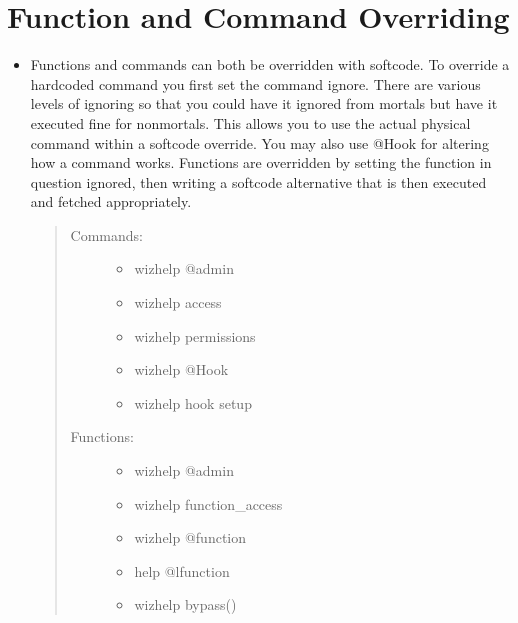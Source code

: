 \documentclass[letterpaper,10pt,english]{sphinxmanual}
\begin{document}
\section{Function and Command Overriding}
\label{\detokenize{12-advanced:function-and-command-overriding}}\begin{itemize}
\item {} 
\sphinxAtStartPar
Functions and commands can both be overridden with softcode.  To
override a hardcoded command you first set the command ignore.
There are various levels of ignoring so that you could have it
ignored from mortals but have it executed fine for non\sphinxhyphen{}mortals.
This allows you to use the actual physical command within a
softcode override.  You may also use @Hook for altering how
a command works.   Functions are overridden by setting the
function in question ignored, then writing a softcode alternative
that is then executed and fetched appropriately.
\begin{quote}
\begin{description}
\item[{Commands:}] \leavevmode\begin{itemize}
\item {} 
\sphinxAtStartPar
wizhelp @admin

\item {} 
\sphinxAtStartPar
wizhelp access

\item {} 
\sphinxAtStartPar
wizhelp permissions

\item {} 
\sphinxAtStartPar
wizhelp @Hook

\item {} 
\sphinxAtStartPar
wizhelp hook setup

\end{itemize}

\item[{Functions:}] \leavevmode\begin{itemize}
\item {} 
\sphinxAtStartPar
wizhelp @admin

\item {} 
\sphinxAtStartPar
wizhelp function\_access

\item {} 
\sphinxAtStartPar
wizhelp @function

\item {} 
\sphinxAtStartPar
help @lfunction

\item {} 
\sphinxAtStartPar
wizhelp bypass()

\end{itemize}

\end{description}
\end{quote}

\end{itemize}
\end{document}
